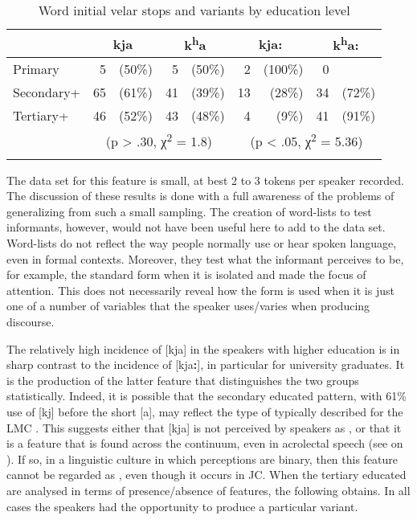 \begin{table}
\begin{tabular}{l*{4}{r@{ }r}}
\lsptoprule
& \multicolumn{2}{c}{kja} & \multicolumn{2}{c}{k\textsuperscript{h}a} & \multicolumn{2}{c}{kja:} & \multicolumn{2}{c}{k\textsuperscript{h}a:}\\
\midrule
Primary & 5      & (50\%) &    5 & (50\%)      & 2  & (100\%)    &      0& \\
Secondary+ & 65 & (61\%) &   41 & (39\%)      & 13 & (28\%)     &      34 &(72\%)\\
Tertiary+ & 46  & (52\%) &   43 & (48\%)      & 4  & (9\%)      &      41 &(91\%)\\\cmidrule(lr){2-5}\cmidrule(lr){6-9}
   & \multicolumn{4}{c}{(p > .30, χ\textsuperscript{2} = 1.8)}        &        \multicolumn{4}{c}{(p < .05, χ\textsuperscript{2} = 5.36)}\\
\lspbottomrule
\end{tabular}
\caption{Word initial velar stops and variants by education level}
\label{tab:3.8}
\end{table}

The data set for this feature is small, at best 2 to 3 tokens per speaker recorded.  The discussion of these results is done with a full awareness of the problems of generalizing from such a small sampling.  The creation of word-lists to test informants, however, would not have been useful here to add to the data set.  Word-lists do not reflect the way people normally use or hear spoken language, even in formal contexts.  Moreover, they test what the informant perceives to be, for example, the standard form when it is isolated and made the focus of attention.  This does not necessarily reveal how the form is used when it is just one of a number of variables that the speaker uses\slash varies when producing discourse.    

The relatively high incidence of [kja] in the speakers with higher education is in sharp contrast to the incidence of [kja\textbf{:}], in particular for university graduates.  It is the production of the latter feature that distinguishes the two groups statistically.  Indeed, it is possible that the secondary educated pattern, with 61\% use of [kj] before the short [a], may reflect the type of  typically described for the LMC \citep[254]{Labov1980}.  This suggests either that [kja] is not perceived by speakers as , or that it is a feature that is found across the continuum, even in acrolectal speech (see  on ).  If so, in a linguistic culture in which perceptions are binary, then this feature cannot be regarded as , even though it occurs in JC.  When the tertiary educated are analysed in terms of  presence\slash absence of features, the following obtains.  In all cases the speakers had the opportunity to produce a particular variant.  

